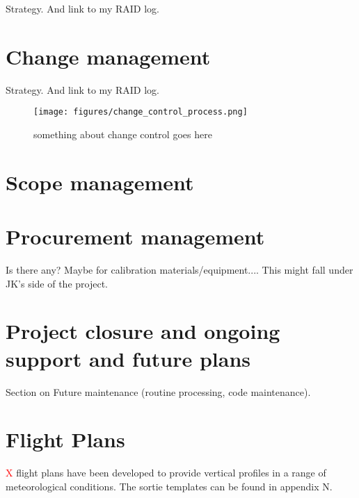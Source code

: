 \documentclass[11pt]{article} %
\begin{document}
Strategy. And link to my RAID log.

\newpage
\section{Change management}

Strategy. And link to my RAID log.

\begin{figure}[!h]
    \caption{something about change control goes here}
    \centering
    \texttt{[image: figures/change\_control\_process.png]}
    \label{fig:changecontrol}
\end{figure}


\newpage
\section{Scope management}

\newpage
\section{Procurement management}
Is there any? Maybe for calibration materials/equipment.... This might fall under JK's side of the project.

\newpage
\section{Project closure and ongoing support and future plans}
Section on Future maintenance (routine processing, code maintenance).
\pagebreak

\newpage
\section{Flight Plans}

\textcolor{red}{X} flight plans have been developed to provide vertical profiles in a range of meteorological conditions. The sortie templates can be found in appendix N.
 
\end{document}
